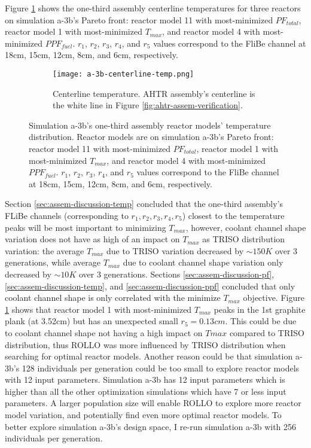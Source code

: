 Figure \ref{fig:a-3b-centerline-temp} shows the one-third assembly centerline 
temperatures for three reactors on simulation a-3b's Pareto front: reactor model 11 
with most-minimized $PF_{total}$, reactor model 1 with most-minimized $T_{max}$, and
reactor model 4 with most-minimized $PPF_{fuel}$.
$r_1$, $r_2$, $r_3$, $r_4$, and $r_5$ values correspond to the FliBe channel at 18cm, 
15cm, 12cm, 8cm, and 6cm, respectively.  
\begin{figure}[htbp!]
    \begin{subfigure}{\textwidth}
        \centering
        \texttt{[image: a-3b-centerline-temp.png]}
        \caption{Centerline temperature. AHTR assembly's centerline is the white line 
        in Figure \ref{fig:ahtr-assem-verification}.}
        \label{fig:a-3b-centerline-temp} 
    \end{subfigure}
    \caption{Simulation a-3b's one-third assembly reactor models' temperature 
    distribution. Reactor models are on simulation a-3b's Pareto front: 
    reactor model 11 with most-minimized $PF_{total}$, 
    reactor model 1 with most-minimized $T_{max}$, and
    reactor model 4 with most-minimized $PPF_{fuel}$. 
    $r_1$, $r_2$, $r_3$, $r_4$, and $r_5$ values correspond to the FliBe channel at 18cm, 
    15cm, 12cm, 8cm, and 6cm, respectively.  }
    \label{fig:a-3b-temp-distribution}
\end{figure}
Section \ref{sec:assem-discussion-temp} concluded that the one-third assembly's FLiBe 
channels (corresponding to $r_1, r_2, r_3, r_4, r_5$) closest to the temperature peaks 
will be most important to minimizing $T_{max}$, however, coolant channel shape variation 
does not have as high of an impact on $T_{max}$ as \gls{TRISO} distribution variation: 
the average $T_{max}$ due to \gls{TRISO} variation decreased by $\sim150K$ over 3 
generations, while average $T_{max}$ due to coolant channel shape variation only 
decreased by $\sim10K$ over 3 generations. 
Sections \ref{sec:assem-discussion-pf}, \ref{sec:assem-discussion-temp}, and 
\ref{sec:assem-discussion-ppf} concluded that only coolant channel shape is only 
correlated with the minimize $T_{max}$ objective. 
Figure \ref{fig:a-3b-centerline-temp} shows that reactor model 1 with most-minimized 
$T_{max}$ peaks in the 1st graphite plank (at 3.52cm) but has an unexpected small 
$r_5 = 0.13cm$.
This could be due to coolant channel shape not having a high impact on $T{max}$ compared 
to TRISO distribution, thus \gls{ROLLO} was more influenced by TRISO distribution when 
searching for optimal reactor models. 
Another reason could be that simulation a-3b's 128 individuals per generation could be 
too small to explore reactor models with 12 input parameters. 
Simulation a-3b has 12 input parameters which is higher than all the other optimization 
simulations which have 7 or less input parameters. 
A larger population size will enable \gls{ROLLO} to explore more reactor model variation, 
and potentially find even more optimal reactor models. 
To better explore simulation a-3b's design space, I re-run simulation a-3b with 
256 individuals per generation. 

